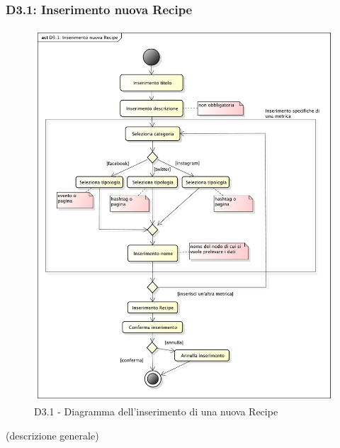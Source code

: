 

		\subsubsection{D3.1: Inserimento nuova Recipe} %
		\label{ssub:inserimento_nuova_recipe}
		\begin{figure}[!htbp]
			\centering
			\centerline{\includegraphics[scale=0.45]{./images/D3_1.pdf}}
			\caption{D3.1 - Diagramma dell'inserimento di una nuova Recipe}
		\end{figure}
		\noindent
		[TO DO] (descrizione generale)


